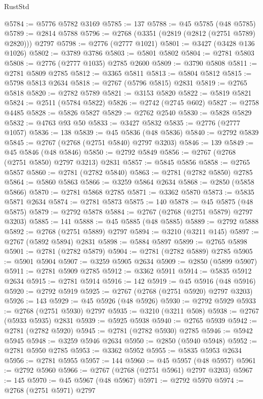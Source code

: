 \begin{lexlean}{RustStd}
\begin{coremodule}
@5784 := @5776 @5782 @3169
@5785 := 137
@5788 := @45 @5785 (@48 @5785)
@5789 := @2814 @5788
@5796 := @2768 (@3351 (@2819 (@2812 (@2751 @5789) @2820))) @2797
@5798 := @2776 (@2777 @1021)
@5801 := @3427 (@3428 @136 @1026)
@5802 := @3789 @3786
@5803 := @5801 @5802
@5804 := @2781 @5803
@5808 := @2776 (@2777 @1035) @2785 @2600
@5809 := @3790 @5808
@5811 := @2781 @5809 @2785
@5812 := @3365 @5811
@5813 := @5804 @5812
@5815 := @5798 @5813 @2634
@5818 := @2767 (@5796 @5815) @2831
@5819 := @2765 @5818
@5820 := @2782 @5789
@5821 := @3153 @5820
@5822 := @5819 @5821
@5824 := @2511 (@5784 @5822)
@5826 := @2742 (@2745 @602)
@5827 := @2758 @4485
@5828 := @5826 @5827
@5829 := @2762 @2540
@5830 := @5828 @5829
@5832 := @4763 @93 @50
@5833 := @3427 @5832
@5835 := @2776 (@2777 @1057)
@5836 := 138
@5839 := @45 @5836 (@48 @5836)
@5840 := @2792 @5839
@5845 := @2767 (@2768 (@2751 @5840) @2797 @3203)
@5846 := 139
@5849 := @45 @5846 (@48 @5846)
@5850 := @2792 @5849
@5856 := @2767 (@2768 (@2751 @5850) @2797 @3213) @2831
@5857 := @5845 @5856
@5858 := @2765 @5857
@5860 := @2781 (@2782 @5840)
@5863 := @2781 (@2782 @5850) @2785
@5864 := @5860 @5863
@5866 := @3259 @5864 @2634
@5868 := @2850 (@5858 @5866)
@5870 := @2781 @5868 @2785
@5871 := @3362 @5870
@5873 := @5835 @5871 @2634
@5874 := @2781 @5873
@5875 := 140
@5878 := @45 @5875 (@48 @5875)
@5879 := @2792 @5878
@5884 := @2767 (@2768 (@2751 @5879) @2797 @3203)
@5885 := 141
@5888 := @45 @5885 (@48 @5885)
@5889 := @2792 @5888
@5892 := @2768 (@2751 @5889) @2797
@5894 := @3210 (@3211 @145)
@5897 := @2767 (@5892 @5894) @2831
@5898 := @5884 @5897
@5899 := @2765 @5898
@5901 := @2781 (@2782 @5879)
@5904 := @2781 (@2782 @5889) @2785
@5905 := @5901 @5904
@5907 := @3259 @5905 @2634
@5909 := @2850 (@5899 @5907)
@5911 := @2781 @5909 @2785
@5912 := @3362 @5911
@5914 := @5835 @5912 @2634
@5915 := @2781 @5914
@5916 := 142
@5919 := @45 @5916 (@48 @5916)
@5920 := @2792 @5919
@5925 := @2767 (@2768 (@2751 @5920) @2797 @3203)
@5926 := 143
@5929 := @45 @5926 (@48 @5926)
@5930 := @2792 @5929
@5933 := @2768 (@2751 @5930) @2797
@5935 := @3210 (@3211 @508)
@5938 := @2767 (@5933 @5935) @2831
@5939 := @5925 @5938
@5940 := @2765 @5939
@5942 := @2781 (@2782 @5920)
@5945 := @2781 (@2782 @5930) @2785
@5946 := @5942 @5945
@5948 := @3259 @5946 @2634
@5950 := @2850 (@5940 @5948)
@5952 := @2781 @5950 @2785
@5953 := @3362 @5952
@5955 := @5835 @5953 @2634
@5956 := @2781 @5955
@5957 := 144
@5960 := @45 @5957 (@48 @5957)
@5961 := @2792 @5960
@5966 := @2767 (@2768 (@2751 @5961) @2797 @3203)
@5967 := 145
@5970 := @45 @5967 (@48 @5967)
@5971 := @2792 @5970
@5974 := @2768 (@2751 @5971) @2797

\end{coremodule}
\end{lexlean}
